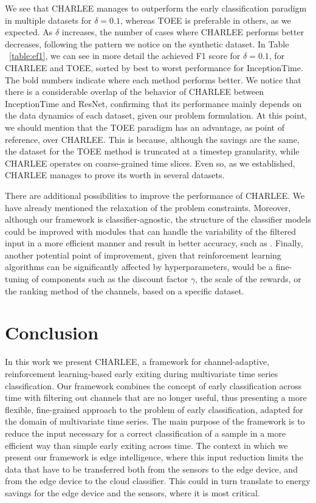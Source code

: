\documentclass[conference]{IEEEtran}
\begin{document}
We see that CHARLEE manages to outperform the early classification paradigm in multiple datasets for $\delta=0.1$, whereas TOEE is preferable in others, as we expected. As $\delta$ increases, the number of cases where CHARLEE performs better decreases, following the pattern we notice on the synthetic dataset. In Table ~\ref{table:ef1}, we can see in more detail the achieved F1 score for $\delta = 0.1$, for CHARLEE and TOEE, sorted by best to worst performance for InceptionTime. The bold numbers indicate where each method performs better. We notice that there is a considerable overlap of the behavior of CHARLEE between InceptionTime and ResNet, confirming that its performance mainly depends on the data dynamics of each dataset, given our problem formulation. At this point, we should mention that the TOEE paradigm has an advantage, as point of reference, over CHARLEE. This is because, although the savings are the same, the dataset for the TOEE method is truncated at a timestep granularity, while CHARLEE operates on coarse-grained time slices. Even so, as we established, CHARLEE manages to prove its worth in several datasets.

There are additional possibilities to improve the performance of CHARLEE. We have already mentioned the relaxation of the problem constraints. Moreover, although our framework is classifier-agnostic, the structure of the classifier models could be improved with modules that can handle the variability of the filtered input in a more efficient manner and result in better accuracy, such as \cite{sawada2022convolutional}. Finally, another potential point of improvement, given that reinforcement learning algorithms can be significantly affected by hyperparameters\cite{islam2017reproducibility}, would be a fine-tuning of components such as the discount factor $\gamma$, the scale of the rewards, or the ranking method of the channels, based on a specific dataset.



\section{Conclusion}
In this work we present CHARLEE, a framework for channel-adaptive, reinforcement learning-based early exiting during multivariate time series classification. Our framework combines the concept of early classification across time with filtering out channels that are no longer useful, thus presenting a more flexible, fine-grained approach to the problem of early classification, adapted for the domain of multivariate time series. The main purpose of the framework is to reduce the input necessary for a correct classification of a sample in a more efficient way than simple early exiting across time. The context in which we present our framework is edge intelligence, where this input reduction limits the data that have to be transferred both from the sensors to the edge device, and from the edge device to the cloud classifier. This could in turn translate to energy savings for the edge device and the sensors, where it is most critical.
\end{document}

